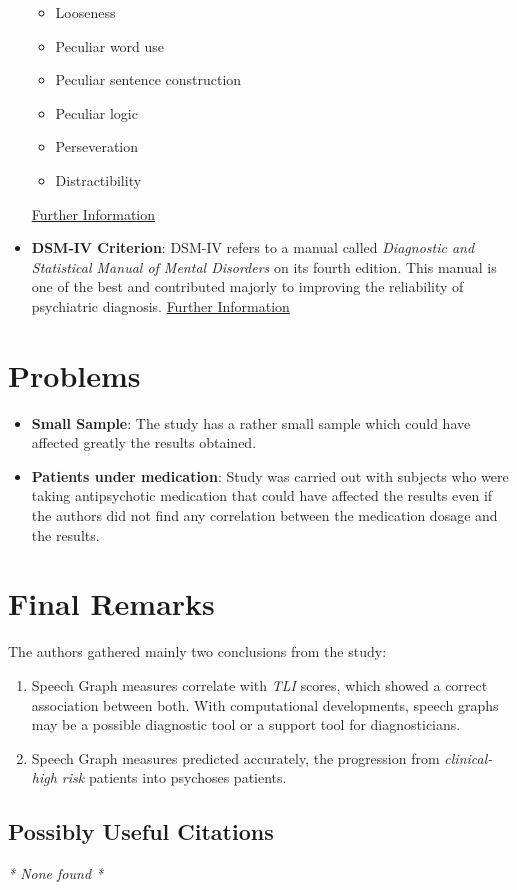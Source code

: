 \documentclass{Paper_Summary}
\begin{document}
\begin{itemize}
\begin{itemize}
            \item Looseness
            \item Peculiar word use
            \item Peculiar sentence construction
            \item Peculiar logic
            \item Perseveration
            \item Distractibility
        \end{itemize}
        \href{https://www.cambridge.org/core/journals/the-british-journal-of-psychiatry/article/thought-and-language-index-an-instrument-for-assessing-thought-and-language-in-schizophrenia/FEFB9ADC871CDFE528B4B87F99A4F054}{Further Information}
        \item \textbf{DSM-IV Criterion}: DSM-IV refers to a manual called \emph{Diagnostic and Statistical Manual of Mental Disorders} on its fourth edition. This manual is one of the best and contributed majorly to improving the reliability of psychiatric diagnosis. \href{https://en.wikipedia.org/wiki/Diagnostic_and_Statistical_Manual_of_Mental_Disorders#DSM-IV_(1994)}{Further Information}
         
    \end{itemize}

\section{Problems}
    \begin{itemize}
        \item \textbf{Small Sample}: The study has a rather small sample which could have affected greatly the results obtained.
        \item \textbf{Patients under medication}: Study was carried out with subjects who were taking antipsychotic medication that could have affected the results even if the authors did not find any correlation between the medication dosage and the results.
    \end{itemize}

\section{Final Remarks}

    The authors gathered mainly two conclusions from the study:
    \begin{enumerate}
        \item Speech Graph measures correlate with \emph{TLI} scores, which showed a correct association between both. With computational developments, speech graphs may be a possible diagnostic tool or a support tool for diagnosticians.
        \item Speech Graph measures predicted accurately, the progression from \emph{clinical-high risk} patients into psychoses patients. 
    \end{enumerate}

\breakline

\begin{center}
    \section*{Possibly Useful Citations}
\end{center}
\emph{* None found *}
\end{document}
